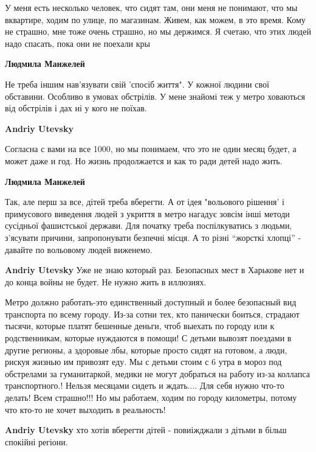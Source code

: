 \begin{itemize}

У меня есть несколько человек, что сидят там, они меня не понимают, что мы
вквартире, ходим по улице, по магазинам. Живем, как можем, в это время. Кому не
страшно, мне тоже очень страшно, но мы держимся. Я счетаю, что этих людей надо
спасать, пока они не поехали кры

\begin{itemize} %
\textbf{Людмила Манжелей} 

Не треба іншим нав'язувати свій 'спосіб життя". У кожної людини свої обставини.
Особливо в умовах обстрілів. У мене знайомі теж у метро ховаються від обстрілів
і дах ні у кого не поїхав.

\textbf{Andriy Utevsky} 

Согласна с вами на все 1000, но мы понимаем, что это не один месяц будет, а может
даже и год. Но жизнь продолжается и как то ради детей надо жить.

\textbf{Людмила Манжелей} 

Так, але перш за все, дітей треба вберегти. А от ідея "вольового рішення' і
примусового виведення людей з укриття в метро нагадує зовсім інші методи
сусідньої фашистської держави. Для початку треба поспілкуватись з людьми,
з'ясувати причини, запропонувати безпечні місця. А то різні \enquote{жорсткі хлопці} -
давайте по вольовому людей виженемо.

\textbf{Andriy Utevsky} Уже не знаю который раз. Безопасных мест в Харькове нет и до конца войны не будет. Не нужно жить в иллюзиях.


Метро должно работать-это единственный доступный и более безопасный вид
транспорта по всему городу. Из-за сотни тех, кто панически боиться, страдают
тысячи, которые платят бешенные деньги, чтоб выехать по городу или к
родственникам, которые нуждаются в помощи! С детьми вывозят поездами в другие
регионы, а здоровые лбы, которые просто сидят на готовом, а люди, рискуя жизнью
им привозят еду. Мы с детьми стоим с 6 утра в мороз под обстрелами за
гуманитаркой, медики не могут добраться на работу из-за коллапса
транспортного.! Нельзя месяцами сидеть и ждать.... Для себя нужно что-то
делать! Всем страшно!!! Но мы работаем, ходим по городу километры, потому что
кто-то не хочет выходить в реальность!

\textbf{Andriy Utevsky} хто хотів вберегти дітей - повиіжджали з дітьми в більш спокійні регіони.
\end{itemize} %


\end{itemize}
